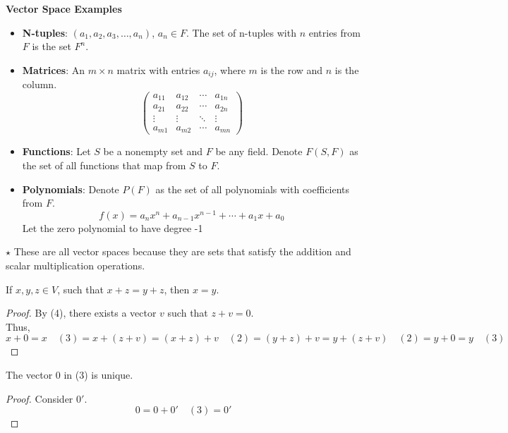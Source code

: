 \documentclass{article}
\begin{document}
 \textbf{Vector Space Examples}
 \begin{itemize}
     \item \textbf{N-tuples}: $(a_1, a_2, a_3, \ldots, a_n)$, $a_n \in F$. The set of n-tuples with $n$ entries from $F$ is the set $F^n$.
     \item \textbf{Matrices}: An $m \times n$ matrix with entries $a_{ij}$, where $m$ is the row and $n$ is the column.\\
     \[
     \begin{pmatrix}
         a_{11} & a_{12} & \cdots & a_{1n} \\
         a_{21} & a_{22} & \cdots & a_{2n} \\
         \vdots & \vdots & \ddots & \vdots \\ 
         a_{m1} & a_{m2} & \cdots & a_{mn}
     \end{pmatrix}
     \]
     \item \textbf{Functions}: Let $S$ be a nonempty set and $F$ be any field. Denote $F(S, F)$ as the set of all functions that map from $S$ to $F$.
     \item \textbf{Polynomials}: Denote $P(F)$ as the set of all polynomials with coefficients from $F$.
     \[
         f(x) = a_nx^n + a_{n-1}x^{n-1} + \cdots + a_1 x + a_0
     \]
     Let the zero polynomial to have degree -1
 \end{itemize}
 
 $\star$ These are all vector spaces because they are sets that satisfy the addition and scalar multiplication operations.
 
 \begin{theorem}
 If $x, y, z \in V$, such that $x + z = y + z$, then $x = y$.
 \end{theorem}
 
 \begin{proof}
     By (4), there exists a vector $v$ such that $z + v = 0$. \\
     Thus,
     \[
     x + 0 = x \quad (3) = x + (z + v) = (x + z) + v \quad (2) = (y + z) + v = y + (z + v) \quad (2) = y + 0 = y \quad (3)
     \]
 \end{proof}
 
 \begin{corollary}
 The vector $0$ in (3) is unique.
 \end{corollary}
 
 \begin{proof}
     Consider $0'$.
     \[
     0 = 0 + 0' \quad (3) = 0'
     \]
 \end{proof}
 
 
\end{document}
